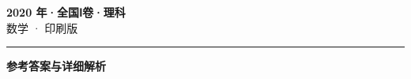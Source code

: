 \documentclass[zihao=5, a4paper]{ctexart}
\begin{document}
\begin{center}
  {\Large\bfseries 2020 年·全国Ⅰ卷·理科}\\[4pt]
  {\large 数学 · 印刷版}
\end{center}
\medskip
{}

\par\bigskip\hrule\bigskip
{}
\begin{center}{\large\bfseries 参考答案与详细解析}\end{center}
\smallskip

\end{document}
